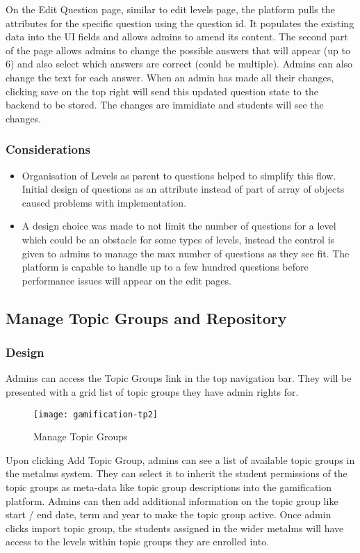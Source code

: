On the Edit Question page, similar to edit levels page, the platform pulls the attributes for the specific question using the question id. It populates the existing data into the UI fields and allows admins to amend its content. The second part of the page allows admins to change the possible answers that will appear (up to 6) and also select which answers are correct (could be multiple). Admins can also change the text for each answer. When an admin has made all their changes, clicking save on the top right will send this updated question state to the backend to be stored. The changes are immidiate and students will see the changes.

\subsubsection{Considerations}
\begin{itemize}
    \item Organisation of Levels as parent to questions helped to simplify this flow. Initial design of questions as an attribute instead of part of array of objects caused problems with implementation.
    \item A design choice was made to not limit the number of questions for a level which could be an obstacle for some types of levels, instead the control is given to admins to manage the max number of questions as they see fit. The platform is capable to handle up to a few hundred questions before performance issues will appear on the edit pages.
\end{itemize}

\newpage

\subsection{Manage Topic Groups and Repository}
\subsubsection{Design}
Admins can access the Topic Groups link in the top navigation bar. They will be presented with a grid list of topic groups they have admin rights for. 

\begin{figure}[h!]
    \texttt{[image: gamification-tp2]}
    \centering
    \caption{Manage Topic Groups}
\end{figure}

Upon clicking Add Topic Group, admins can see a list of available topic groups in the metalms system. They can select it to inherit the student permissions of the topic groups as meta-data like topic group descriptions into the gamification platform. Admins can then add additional information on the topic group like start / end date, term and year to make the topic group active. Once admin clicks import topic group, the students assigned in the wider metalms will have access to the levels within topic groups they are enrolled into. 

